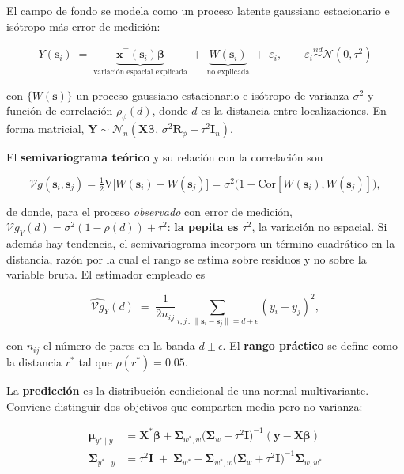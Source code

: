 \documentclass[11pt,a4paper]{article}
\newcommand{\loc}{\bm{s}}
\newcommand{\loci}[1]{\bm{s}_{#1}}
\newcommand{\dsc}{d}
\newcommand{\Wp}[1]{W(#1)}
\newcommand{\Yp}[1]{Y(#1)}
\newcommand{\varesp}{\sigma^{2}}
\newcommand{\pepita}{\tau^{2}}
\newcommand{\escala}{\phi}
\newcommand{\corr}{\rho}
\newcommand{\Rphi}{\bm{R}_{\escala}}
\newcommand{\rangop}{r^{*}}
\newcommand{\Var}{\mathrm{V}}
\newcommand{\Cor}{\mathrm{Cor}}
\newcommand{\Normal}{\mathcal{N}}
\newcommand{\Vg}{\mathcal{V}\!g}
\begin{document}
El campo de fondo se modela como un proceso latente gaussiano estacionario e
isótropo más error de medición:

\begin{equation}
\Yp{\loci{i}} \;=\; \underbrace{\bm{x}^{\!\top}\!(\loci{i})\bm{\beta}}
_{\text{variación espacial explicada}}
\;+\; \underbrace{\Wp{\loci{i}}}_{\text{no explicada}}
\;+\; \varepsilon_i,
\qquad \varepsilon_i \overset{iid}{\sim} \Normal(0,\pepita)
\end{equation}

con $\{\Wp{\loc}\}$ un proceso gaussiano estacionario e isótropo de varianza
$\varesp$ y función de correlación $\corr_{\escala}(\dsc)$, donde $\dsc$ es la
distancia entre localizaciones. En forma matricial,
$\bm{Y}\sim\Normal_n(\bm{X}\bm{\beta},\, \varesp\Rphi + \pepita\bm{I}_n)$.

El \textbf{semivariograma teórico} y su relación con la correlación son

\begin{equation}
\Vg(\loci{i},\loci{j}) = \tfrac{1}{2}\Var\!\big[\Wp{\loci{i}}-\Wp{\loci{j}}\big]
= \varesp\big(1-\Cor[\Wp{\loci{i}},\Wp{\loci{j}}]\big),
\end{equation}

de donde, para el proceso \emph{observado} con error de medición,
$\Vg_Y(\dsc) = \varesp(1-\corr(\dsc)) + \pepita$: \textbf{la pepita es
$\pepita$}, la variación no espacial. Si además hay tendencia, el
semivariograma incorpora un término cuadrático en la distancia, razón por la
cual el rango se estima sobre residuos y no sobre la variable bruta. El
estimador empleado es

\begin{equation}
\widehat{\Vg}_{Y}(\dsc) \;=\; \frac{1}{2n_{ij}}
\sum_{i,j\,:\,\lVert \loci{i}-\loci{j}\rVert = \dsc \pm \epsilon}
(y_i-y_j)^2 ,
\end{equation}

con $n_{ij}$ el número de pares en la banda $\dsc\pm\epsilon$. El
\textbf{rango práctico} se define como la distancia $\rangop$ tal que
$\corr(\rangop) = \num{0.05}$.

La \textbf{predicción} es la distribución condicional de una normal
multivariante. Conviene distinguir dos objetivos que comparten media pero no
varianza:

\begin{align}
\bm{\mu}_{y^*\mid y} &= \bm{X}^{*}\bm{\beta}
+ \bm{\Sigma}_{w^*\!,w}\big(\bm{\Sigma}_w+\pepita\bm{I}\big)^{-1}
(\bm{y}-\bm{X}\bm{\beta}) \\[2pt]
\bm{\Sigma}_{y^*\mid y} &= \pepita\bm{I} \;+\;
\bm{\Sigma}_{w^*} - \bm{\Sigma}_{w^*\!,w}
\big(\bm{\Sigma}_w+\pepita\bm{I}\big)^{-1}\bm{\Sigma}_{w,w^*}
\end{align}
\end{document}
